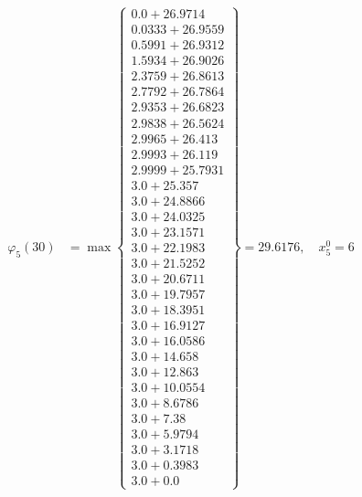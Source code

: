 \documentclass{article}
\begin{document}
\begin{align*}
  
\varphi_{5}(30) &= \max \left\{ \begin{array}{c}
0.0 + 26.9714 \\
 0.0333 + 26.9559 \\
 0.5991 + 26.9312 \\
 1.5934 + 26.9026 \\
 2.3759 + 26.8613 \\
 2.7792 + 26.7864 \\
 2.9353 + 26.6823 \\
 2.9838 + 26.5624 \\
 2.9965 + 26.413 \\
 2.9993 + 26.119 \\
 2.9999 + 25.7931 \\
 3.0 + 25.357 \\
 3.0 + 24.8866 \\
 3.0 + 24.0325 \\
 3.0 + 23.1571 \\
 3.0 + 22.1983 \\
 3.0 + 21.5252 \\
 3.0 + 20.6711 \\
 3.0 + 19.7957 \\
 3.0 + 18.3951 \\
 3.0 + 16.9127 \\
 3.0 + 16.0586 \\
 3.0 + 14.658 \\
 3.0 + 12.863 \\
 3.0 + 10.0554 \\
 3.0 + 8.6786 \\
 3.0 + 7.38 \\
 3.0 + 5.9794 \\
 3.0 + 3.1718 \\
 3.0 + 0.3983 \\
 3.0 + 0.0
\end{array} \right\}=29.6176,\quad x_{5}^0=6\\
  
  
  

\end{align*}
\end{document}
